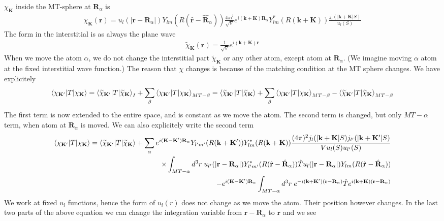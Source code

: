 \documentclass[aps,prb,floatfix,epsfig,singlecolumn,showpacs,preprintnumbers]{revtex4}
\newcommand{\vR}{{\mathbf{R}}}
\renewcommand{\vr}{{\mathbf{r}}}
\newcommand{\vk}{{\mathbf{k}}}
\newcommand{\vK}{{\mathbf{K}}}
\begin{document}
$\chi_\vK$ inside the MT-sphere at $\vR_\alpha$ is
\begin{eqnarray}
\chi_{\vK}(\vr) = u_l(|\vr-\vR_\alpha|)
  Y_{lm}(R(\hat{\vr}-\hat{\vR}_\alpha)) 
\frac{4\pi i^l}{\sqrt{V}}e^{i(\vk+\vK)\vR_\alpha}
  Y_{lm}^*(R(\vk+\vK)) \frac{j_l(|\vk+\vK|S)}{u_l(S)}
\end{eqnarray}
The form in the interstitial is as always the plane wave
\begin{eqnarray}
\widetilde{\chi}_\vK(\vr) = \frac{1}{\sqrt{V}} e^{i(\vk+\vK)\vr}
\end{eqnarray}
When we move the atom $\alpha$, we do not change the interstitial part
$\widetilde{\chi}_\vK$ or any other atom, except atom at
$\vR_\alpha$. (We imagine moving $\alpha$ atom at the fixed
interstitial wave function.) The reason that $\chi$ changes is because
of the matching condition at the MT sphere changes. We have
explicitely
\begin{eqnarray}
\braket{\chi_{\vK'}|T|\chi_{\vK}} = 
\braket{\widetilde{\chi}_{\vK'}|T|\widetilde{\chi}_{\vK}}_I + 
\sum_\beta \braket{\chi_{\vK'}|T|\chi_{\vK}}_{MT-\beta} = 
\braket{\widetilde{\chi}_{\vK'}|T|\widetilde{\chi}_{\vK}}
+\sum_\beta \braket{\chi_{\vK'}|T|\chi_{\vK}}_{MT-\beta} -\braket{\widetilde{\chi}_{\vK'}|T|\widetilde{\chi}_{\vK}}_{MT-\beta} 
\end{eqnarray}
The first term is now extended to the entire space, and is constant as
we move the atom. The second term is changed, but only $MT-\alpha$
term, when atom at $\vR_\alpha$ is moved. 
 We can also explicitely write the second term
\begin{eqnarray}
\braket{\chi_{\vK'}|T|\chi_{\vK}} = \braket{\widetilde{\chi}_{\vK'}|T|\widetilde{\chi}_{\vK}} + 
%
\sum_\alpha  e^{i(\vK-\vK')\vR_\alpha}
  Y_{l'm'}(R(\vk+\vK'))   Y_{lm}^*(R(\vk+\vK))
\frac{(4\pi)^2 j_l(|\vk+\vK|S) j_{l'}(|\vk+\vK'|S)}{V u_l(S) u_{l'}(S)}
\nonumber\\
\times
\int_{MT-\alpha} d^3r \;
u_{l'}(|\vr-\vR_\alpha|)  Y^*_{l'm'}(R(\hat{\vr}-\hat{\vR}_\alpha)) 
\hat{T}
u_l(|\vr-\vR_\alpha|)  Y_{lm}(R(\hat{\vr}-\hat{\vR}_\alpha)) \\
- e^{i(\vK-\vK')\vR_\alpha} \int_{MT-\alpha} d^3 r\; e^{-i(\vk+\vK')(\vr-\vR_\alpha)} \hat{T}  e^{i(\vk+\vK)(\vr-\vR_\alpha)}
\end{eqnarray}
We work at fixed $u_l$ functions, hence the form of $u_l(r)$ does not
change as we move the atom. Their position however changes. In the
last two parts of the above equation we can change the integration variable
from $\vr-\vR_\alpha$ to $\vr$ and we see
\end{document}

